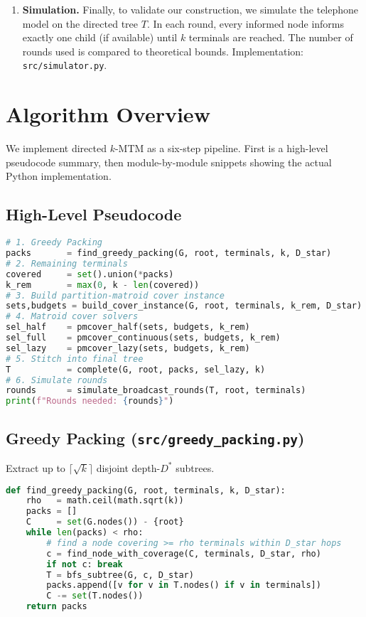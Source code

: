 \documentclass[12pt]{article}
\begin{document}
\begin{enumerate}
  \item \textbf{Simulation.}  
    Finally, to validate our construction, we simulate the telephone model on the directed tree \(T\).  In each round, every informed node informs exactly one child (if available) until \(k\) terminals are reached.  The number of rounds used is compared to theoretical bounds.  
    Implementation: \texttt{src/simulator.py}.
\end{enumerate}
\section{Algorithm Overview}
\label{sec:overview}

We implement directed \(k\)-MTM as a six-step pipeline.  First is a high-level pseudocode summary, then module-by-module snippets showing the actual Python implementation.

\subsection*{High-Level Pseudocode}
\begin{lstlisting}[language=Python,caption={End-to-end pipeline}]
# 1. Greedy Packing
packs       = find_greedy_packing(G, root, terminals, k, D_star)
# 2. Remaining terminals
covered     = set().union(*packs)
k_rem       = max(0, k - len(covered))
# 3. Build partition-matroid cover instance
sets,budgets = build_cover_instance(G, root, terminals, k_rem, D_star)
# 4. Matroid cover solvers
sel_half    = pmcover_half(sets, budgets, k_rem)
sel_full    = pmcover_continuous(sets, budgets, k_rem)
sel_lazy    = pmcover_lazy(sets, budgets, k_rem)
# 5. Stitch into final tree
T           = complete(G, root, packs, sel_lazy, k)
# 6. Simulate rounds
rounds      = simulate_broadcast_rounds(T, root, terminals)
print(f"Rounds needed: {rounds}")
\end{lstlisting}

\subsection*{Greedy Packing (\texttt{src/greedy\_packing.py})}
Extract up to \(\lceil\sqrt{k}\rceil\) disjoint depth-\(D^*\) subtrees.
\begin{lstlisting}[language=Python,caption={find\_greedy\_packing}]
def find_greedy_packing(G, root, terminals, k, D_star):
    rho   = math.ceil(math.sqrt(k))
    packs = []
    C     = set(G.nodes()) - {root}
    while len(packs) < rho:
        # find a node covering >= rho terminals within D_star hops
        c = find_node_with_coverage(C, terminals, D_star, rho)
        if not c: break
        T = bfs_subtree(G, c, D_star)
        packs.append([v for v in T.nodes() if v in terminals])
        C -= set(T.nodes())
    return packs
\end{lstlisting}
\end{document}
